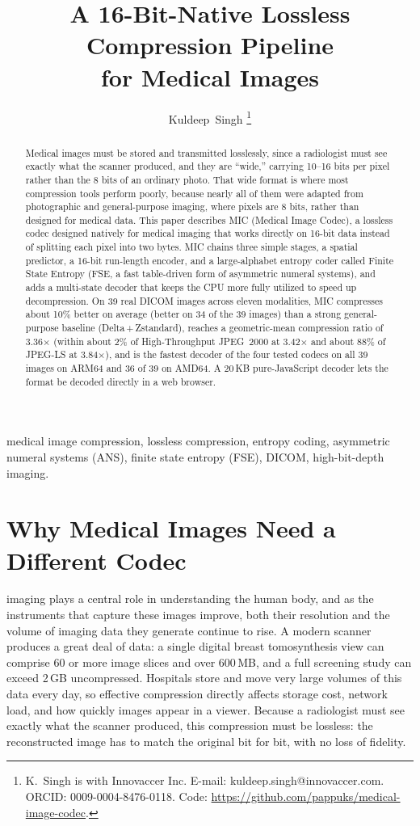\documentclass[journal]{IEEEtran}
\title{A 16-Bit-Native Lossless Compression Pipeline\\
       for Medical Images}
\author{Kuldeep~Singh%
\thanks{K.\ Singh is with Innovaccer Inc.
E-mail: kuldeep.singh@innovaccer.com.
ORCID: 0009-0004-8476-0118.
Code: \url{https://github.com/pappuks/medical-image-codec}.}%
}
\begin{document}
\maketitle

\begin{abstract}
Medical images must be stored and transmitted losslessly, since a radiologist
must see exactly what the scanner produced, and they are ``wide,'' carrying
10--16 bits per pixel rather than the 8 bits of an ordinary photo. That wide
format is where most compression tools perform poorly, because nearly all of
them were adapted from photographic and general-purpose imaging, where pixels
are 8 bits, rather than designed for medical data. This paper describes MIC
(Medical Image Codec), a lossless codec designed natively for medical imaging
that works directly on 16-bit data instead of splitting each pixel into two
bytes. MIC chains three simple stages, a spatial predictor, a
16-bit run-length encoder, and a large-alphabet entropy coder called Finite
State Entropy (FSE, a fast table-driven form of asymmetric numeral systems),
and adds a multi-state decoder that keeps the CPU more fully utilized to speed
up decompression. On 39 real DICOM images across eleven modalities, MIC
compresses about 10\% better on average (better on 34 of the 39 images) than a
strong general-purpose baseline (Delta\,+\,Zstandard), reaches a geometric-mean
compression ratio of 3.36$\times$ (within about 2\% of High-Throughput
JPEG~2000 at 3.42$\times$ and about 88\% of JPEG-LS at 3.84$\times$), and is the
fastest decoder of the four tested codecs on all 39 images on ARM64 and 36 of 39
on AMD64. A 20\,KB pure-JavaScript decoder lets the format be decoded directly
in a web browser.
\end{abstract}

\begin{IEEEkeywords}
medical image compression, lossless compression, entropy coding, asymmetric
numeral systems (ANS), finite state entropy (FSE), DICOM, high-bit-depth
imaging.
\end{IEEEkeywords}

\section{Why Medical Images Need a Different Codec}
\label{sec:intro}

 imaging plays a central role in understanding the human
body, and as the instruments that capture these images improve, both their
resolution and the volume of imaging data they generate continue to rise. A
modern scanner produces a great deal of data: a single digital breast
tomosynthesis view can comprise 60 or more image slices and over 600\,MB, and a
full screening study can exceed 2\,GB uncompressed. Hospitals store and move
very large volumes of this data every day, so effective compression directly
affects storage cost, network load, and how quickly images appear in a viewer.
Because a radiologist must see exactly what the scanner produced, this
compression must be lossless: the reconstructed image has to match the original
bit for bit, with no loss of fidelity.
\end{document}

